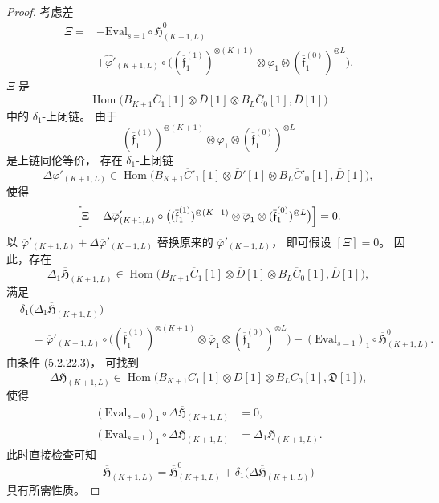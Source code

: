 \begin{proof}
考虑差
\[
\begin{aligned}
\Xi={}&-
\mathrm{Eval}_{s=1}\circ
\overline{\mathfrak H}^{0}_{(K+1,L)}
\\
&+\widehat{\overline\varphi}'_{(K+1,L)}
\circ\bigl(
(\overline{\mathfrak f}^{(1)}_1)^{\otimes(K+1)}
\otimes\overline\varphi_1
\otimes
(\overline{\mathfrak f}^{(0)}_1)^{\otimes L}
\bigr).
\end{aligned}
\]
$\Xi$ 是
\[
\operatorname{Hom}\bigl(
B_{K+1}\overline C_1[1]
\otimes\overline D[1]
\otimes B_L\overline C_0[1],
\overline D[1]\bigr)
\]
中的 $\delta_1$-上闭链。
由于
\[
(\overline{\mathfrak f}^{(1)}_1)^{\otimes(K+1)}
\otimes\overline\varphi_1
\otimes
(\overline{\mathfrak f}^{(0)}_1)^{\otimes L}
\]
是上链同伦等价，
存在 $\delta_1$-上闭链
\[
\Delta\overline\varphi'_{(K+1,L)}
\in\operatorname{Hom}\bigl(
B_{K+1}\overline C'_1[1]
\otimes\overline D'[1]
\otimes B_L\overline C'_0[1],
\overline D[1]\bigr),
\]
使得
\[
\Bigl[
\Xi+
\Delta\overline\varphi'_{(K+1,L)}
\circ
\bigl(
(\overline{\mathfrak f}^{(1)}_1)^{\otimes(K+1)}
\otimes\overline\varphi_1
\otimes
(\overline{\mathfrak f}^{(0)}_1)^{\otimes L}
\bigr)
\Bigr]=0.
\]
以
$\overline\varphi'_{(K+1,L)}
+\Delta\overline\varphi'_{(K+1,L)}$
替换原来的
$\overline\varphi'_{(K+1,L)}$，
即可假设 $[\Xi]=0$。
因此，存在
\[
\Delta_1\overline{\mathfrak H}_{(K+1,L)}
\in\operatorname{Hom}\bigl(
B_{K+1}\overline C_1[1]
\otimes\overline D[1]
\otimes B_L\overline C_0[1],
\overline D[1]\bigr),
\]
满足
\[
\begin{aligned}
&\delta_1\bigl(
\Delta_1\overline{\mathfrak H}_{(K+1,L)}
\bigr)
\\
&\quad=
\overline\varphi'_{(K+1,L)}
\circ\bigl(
(\overline{\mathfrak f}^{(1)}_1)^{\otimes(K+1)}
\otimes\overline\varphi_1
\otimes
(\overline{\mathfrak f}^{(0)}_1)^{\otimes L}
\bigr)
-
(\mathrm{Eval}_{s=1})_1
\circ\overline{\mathfrak H}^{0}_{(K+1,L)}.
\end{aligned}
\]
由条件 (5.2.22.3)，
可找到
\[
\Delta\overline{\mathfrak H}_{(K+1,L)}
\in\operatorname{Hom}\bigl(
B_{K+1}\overline C_1[1]
\otimes\overline D[1]
\otimes B_L\overline C_0[1],
\overline{\mathfrak D}[1]\bigr),
\]
使得
\[
\begin{aligned}
(\mathrm{Eval}_{s=0})_1
\circ\Delta\overline{\mathfrak H}_{(K+1,L)}
&=0,\\
(\mathrm{Eval}_{s=1})_1
\circ\Delta\overline{\mathfrak H}_{(K+1,L)}
&=\Delta_1
\overline{\mathfrak H}_{(K+1,L)}.
\end{aligned}
\]
此时直接检查可知
\[
\overline{\mathfrak H}_{(K+1,L)}
=\overline{\mathfrak H}^{0}_{(K+1,L)}
+\delta_1\bigl(
\Delta\overline{\mathfrak H}_{(K+1,L)}
\bigr)
\]
具有所需性质。
\end{proof}


